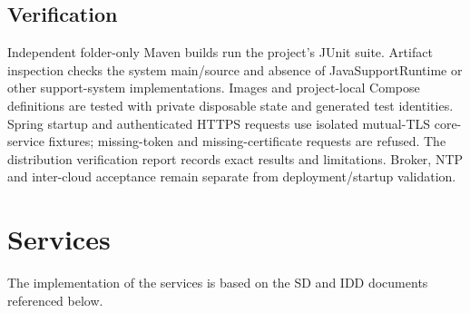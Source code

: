 \documentclass[a4paper]{arrowhead}
\begin{document}
\subsection{Verification}

Independent folder-only Maven builds run the project's JUnit suite. Artifact inspection checks the system main/source and absence of JavaSupportRuntime or other support-system implementations. Images and project-local Compose definitions are tested with private disposable state and generated test identities. Spring startup and authenticated HTTPS requests use isolated mutual-TLS core-service fixtures; missing-token and missing-certificate requests are refused. The distribution verification report records exact results and limitations. Broker, NTP and inter-cloud acceptance remain separate from deployment/startup validation.

\newpage

\section{Services}
\label{sec:services}

The implementation of the services is based on the SD and IDD documents referenced below.
\end{document}
